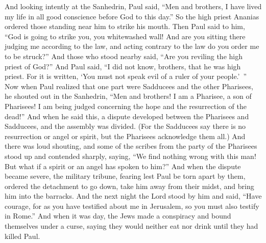 \begin{biblechapter} %
 And looking intently at the Sanhedrin, Paul said, “Men and brothers, I have lived my life in all good conscience before God to this day.”
\verse So the high priest Ananias ordered those standing near him to strike his mouth.
\verse Then Paul said to him, “God is going to strike you, you whitewashed wall! And are you sitting there judging me according to the law, and acting contrary to the law do you order me to be struck?”
\verse And those who stood nearby said, “Are you reviling the high priest of God?”
\verse And Paul said, “I did not know, brothers, that he was high priest. For it is written, ‘You must not speak evil of a ruler of your people.’ ”
\verse Now when Paul realized that one part were Sadducees and the other Pharisees, he shouted out in the Sanhedrin, “Men and brothers! I am a Pharisee, a son of Pharisees! I am being judged concerning the hope and the resurrection of the dead!”
\verse And when he said this, a dispute developed between the Pharisees and Sadducees, and the assembly was divided.
\verse (For the Sadducees say there is no resurrection or angel or spirit, but the Pharisees acknowledge them all.)
\verse And there was loud shouting, and some of the scribes from the party of the Pharisees stood up and contended sharply, saying, “We find nothing wrong with this man! But what if a spirit or an angel has spoken to him?”
\verse And when the dispute became severe, the military tribune, fearing lest Paul be torn apart by them, ordered the detachment to go down, take him away from their midst, and bring him into the barracks.
\verse And the next night the Lord stood by him and said, “Have courage, for as you have testified about me in Jerusalem, so you must also testify in Rome.”
 And when it was day, the Jews made a conspiracy and bound themselves under a curse, saying they would neither eat nor drink until they had killed Paul.

\end{biblechapter}
